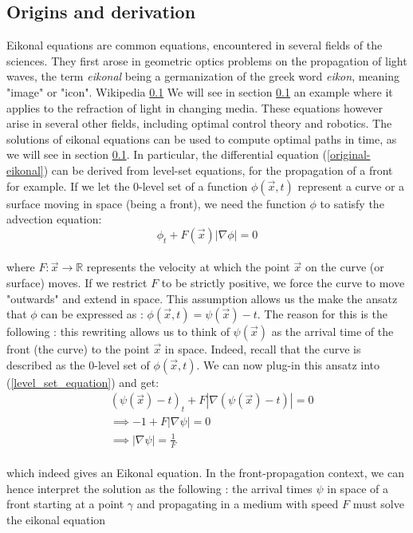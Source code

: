 \documentclass[11pt]{article}
\theoremstyle{definition}
\theoremstyle{remark}
\newcommand{\R}{\mathbb{R}}
\begin{document}
\subsection{Origins and derivation}
Eikonal equations are common equations, encountered in several fields of the sciences. They first arose in geometric optics problems on the propagation of light waves, the term \textit{eikonal} being a germanization of the greek word \textit{eikon}, meaning "image" or "icon". Wikipedia \ref{} We will see in section \ref{} an example where it applies to the refraction of light in changing media.
\vspace{10pt}
These equations however arise in several other fields, including optimal control theory and robotics. The solutions of eikonal equations can be used to compute optimal paths in time, as we will see in section \ref{}.
\vspace{10pt}
In particular, the differential equation (\ref{original-eikonal}) can be derived from level-set equations, for the propagation of a front for example. If we let the 0-level set of a function $\phi(\vec{x},t)$ represent a curve or a surface moving in space (being a front), we need the function $\phi$ to satisfy the advection equation: \\
\begin{equation}
\label{level_set_equation}
    \phi_t+F(\vec{x})|\nabla \phi| =0
\end{equation} \\
where $F:\vec{x}\rightarrow\R$ represents the velocity at which the point $\vec{x}$ on the curve (or surface) moves. If we restrict $F$ to be strictly positive, we force the curve to move "outwards" and extend in space. This assumption allows us the make the ansatz that $\phi$ can be expressed as : $\phi(\vec{x},t)=\psi(\vec{x})-t$. The reason for this is the following : this rewriting allows us to think of $\psi(\vec{x})$ as the arrival time of the front (the curve) to the point $\vec{x}$ in space. Indeed, recall that the curve is described as the 0-level set of $\phi(\vec{x},t)$. We can now plug-in this ansatz into (\ref{level_set_equation}) and get: \\
\begin{align*}
    & (\psi(\vec{x})-t)_t+F|\nabla(\psi(\vec{x})-t)|=0 \\
    &\implies-1 +F|\nabla\psi| = 0 \\
    &\implies |\nabla\psi|=\frac{1}{F}
\end{align*} \\
\noindent which indeed gives an Eikonal equation. In the front-propagation context, we can hence interpret the solution as the following : the arrival times $\psi$ in space of a front starting at a point $\gamma$ and propagating in a medium with speed $F$ must solve the eikonal equation
\end{document}
